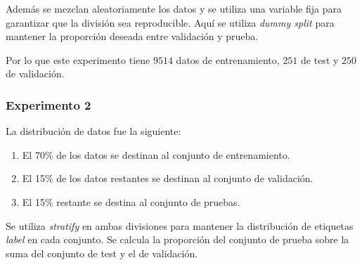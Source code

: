    Además se mezclan aleatoriamente los datos y se utiliza una variable fija para garantizar que la división sea reproducible. Aquí se utiliza \textit{dummy split} para mantener la proporción deseada entre validación y prueba.


Por lo que este experimento tiene $9514$ datos de entrenamiento, $251$ de test y $250$ de validación.

\subsubsection{Experimento 2}

La distribución de datos fue la siguiente:

   \begin{enumerate}
      \item El 70\% de los datos se destinan al conjunto de entrenamiento.
      \item El 15\% de los datos restantes se destinan al conjunto de validación.
      \item El 15\% restante se destina al conjunto de pruebas.
   \end{enumerate}
   
Se utiliza \textit{stratify} en ambas divisiones para mantener la distribución de etiquetas \textit{label} en cada conjunto. Se calcula la proporción del conjunto de prueba sobre la suma del conjunto de test y el de validación. 

